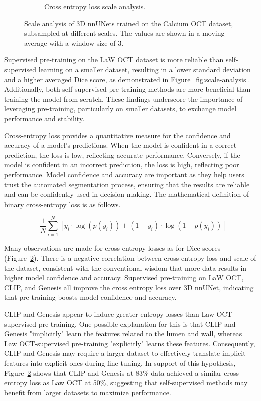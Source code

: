 \documentclass[a4paper,11pt,oneside]{report}
\begin{document}
\begin{figure}[hbt]
\begin{subfigure}[t]{0.49\textwidth}
        \caption{Cross entropy loss scale analysis.}
        \label{fig:cross-entropy-scale-analysis}
    \end{subfigure}
    \caption{Scale analysis of 3D nnUNets trained on the Calcium OCT dataset, subsampled at different scales. The values are shown in a moving average with a window size of 3.}
\end{figure}

Supervised pre-training on the LaW OCT dataset is more reliable than self-supervised learning on a smaller dataset, resulting in a lower standard deviation and a higher averaged Dice score, as demonstrated in Figure~\ref{fig:scale-analysis}. Additionally, both self-supervised pre-training methods are more beneficial than training the model from scratch. These findings underscore the importance of leveraging pre-training, particularly on smaller datasets, to exchange model performance and stability.

Cross-entropy loss provides a quantitative measure for the confidence and accuracy of a model's predictions. When the model is confident in a correct prediction, the loss is low, reflecting accurate performance. Conversely, if the model is confident in an incorrect prediction, the loss is high, reflecting poor performance. Model confidence and accuracy are important as they help users trust the automated segmentation process, ensuring that the results are reliable and can be confidently used in decision-making. The mathematical definition of binary cross-entropy loss is as follows.

\begin{equation}
-\frac{1}{N}\sum_{i=1}^{N}\left[y_{i}\cdot\log\left(p(y_{i})\right)+ \left( 1-y_{i} \right)\cdot \log\left(1 - p(y_{i})\right) \right]
\end{equation}

Many observations are made for cross entropy losses as for Dice scores (Figure~\ref{fig:cross-entropy-scale-analysis}). There is a negative correlation between cross entropy loss and scale of the dataset, consistent with the conventional wisdom that more data results in higher model confidence and accuracy. Supervised pre-training on LaW OCT, CLIP, and Genesis all improve the cross entropy loss over 3D nnUNet, indicating that pre-training boosts model confidence and accuracy. 

CLIP and Genesis appear to induce greater entropy losses than Law OCT-supervised pre-training. One possible explanation for this is that CLIP and Genesis "implicitly" learn the features related to the lumen and wall, whereas Law OCT-supervised pre-training "explicitly" learns these features. Consequently, CLIP and Genesis may require a larger dataset to effectively translate implicit features into explicit ones during fine-tuning. In support of this hypothesis, Figure~\ref{fig:cross-entropy-scale-analysis} shows that CLIP and Genesis at 83\% data achieved a similar cross entropy loss as Law OCT at 50\%, suggesting that self-supervised methods may benefit from larger datasets to maximize performance. 
\end{document}
